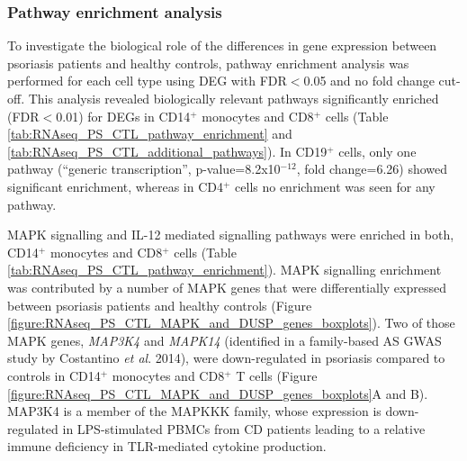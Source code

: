 \subsubsection{Pathway enrichment analysis}

To investigate the biological role of the differences in gene expression between psoriasis patients and healthy controls, pathway enrichment analysis was performed for each cell type using DEG with FDR$<$0.05 and no fold change cut-off. This analysis revealed biologically relevant pathways significantly enriched (FDR$<$0.01) for DEGs in CD14$^+$ monocytes and CD8$^+$ cells (Table \ref{tab:RNAseq_PS_CTL_pathway_enrichment} and \ref{tab:RNAseq_PS_CTL_additional_pathways}). In CD19$^+$ cells, only one pathway (“generic transcription”, p-value=8.2x10$^{-12}$, fold change=6.26) showed significant enrichment, whereas in CD4$^+$ cells no enrichment was seen for any pathway. 



MAPK signalling and IL-12 mediated signalling pathways were enriched in both, CD14$^+$ monocytes and CD8$^+$ cells (Table \ref{tab:RNAseq_PS_CTL_pathway_enrichment}). MAPK signalling enrichment was contributed by a number of MAPK genes that were differentially expressed between psoriasis patients and healthy controls (Figure \ref{figure:RNAseq_PS_CTL_MAPK_and_DUSP_genes_boxplots}). Two of those MAPK genes, \textit{MAP3K4} and \textit{MAPK14} (identified in a family-based AS GWAS study by Costantino \textit{et al}. 2014), were down-regulated in psoriasis compared to controls in CD14$^+$ monocytes and CD8$^+$ T cells (Figure \ref{figure:RNAseq_PS_CTL_MAPK_and_DUSP_genes_boxplots}A and B). MAP3K4 is a member of the MAPKKK family, whose expression is down-regulated in LPS-stimulated PBMCs from CD patients leading to a relative immune deficiency in TLR-mediated cytokine production.

